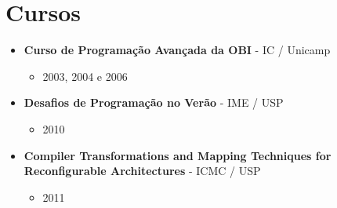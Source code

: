\documentclass[a4paper,10pt]{article}
\begin{document}
  \section{Cursos}
    \begin{itemize}
      \item 
        \textbf{Curso de Programação Avançada da OBI} - IC / Unicamp
        \begin{itemize}
          \item 2003, 2004 e 2006
        \end{itemize}
      \item 
        \textbf{Desafios de Programação no Verão} - IME / USP
        \begin{itemize}
          \item 2010
        \end{itemize}
      \item 
        \textbf{Compiler Transformations and Mapping Techniques for Reconfigurable Architectures} - ICMC / USP
        \begin{itemize}
          \item 2011
        \end{itemize}
    \end{itemize}
\end{document}

